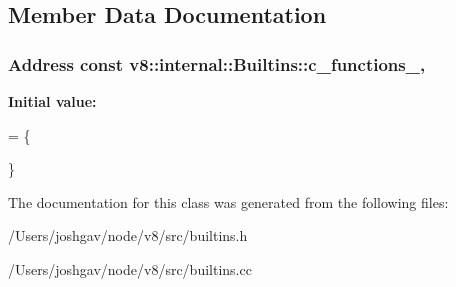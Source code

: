 \subsection{Member Data Documentation}
\subsubsection[{\texorpdfstring{c\+\_\+functions\+\_\+}{c_functions_}}]{\setlength{\rightskip}{0pt plus 5cm}Address const v8\+::internal\+::\+Builtins\+::c\+\_\+functions\+\_\+\hspace{0.3cm}{\ttfamily [static]}, {\ttfamily [private]}}\hypertarget{classv8_1_1internal_1_1_builtins_ae864a1cd00d5defbd492f0c2babdefdf}{}\label{classv8_1_1internal_1_1_builtins_ae864a1cd00d5defbd492f0c2babdefdf}
{\bfseries Initial value\+:}
\begin{DoxyCode}
= \{

\}
\end{DoxyCode}


The documentation for this class was generated from the following files\+:\begin{DoxyCompactItemize}
\item 
/\+Users/joshgav/node/v8/src/builtins.\+h\item 
/\+Users/joshgav/node/v8/src/builtins.\+cc\end{DoxyCompactItemize}
